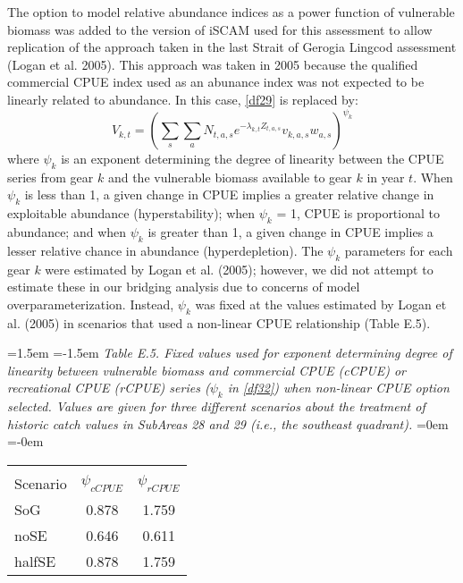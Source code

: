\documentclass[11pt]{article}   %
\def\AppLet{E}                   %
\def\vsd{\vspace*{1ex}}     %
\begin{document}
The option to model relative abundance indices as a power function of vulnerable biomass was added to the version of iSCAM used for this assessment to allow replication of the approach taken in the last Strait of Gerogia Lingcod assessment (Logan et al. 2005).  This approach was taken in 2005 because the qualified commercial CPUE index used as an abunance index was not expected to be linearly related to abundance.  In this case, \eqref{df29} is replaced by:      
\begin{equation}\label{df32}
 V_{k,t} = (\sum_s \sum_a N_{t,a,s} e^{-\lambda_{k,t} Z_{t,a,s}} v_{k,a,s} w_{a,s})^{\psi_k}
\end{equation}
where $\psi_k$ is an exponent determining the degree of linearity between the CPUE series from gear $k$ and the vulnerable biomass available to gear $k$ in year $t$.  When $\psi_k$ is less than 1, a given change in CPUE implies a greater relative change in exploitable abundance (hyperstability); when $\psi_k$ = 1, CPUE is proportional to abundance; and when $\psi_k$ is greater than 1, a given change in CPUE implies a lesser relative chance in abundance (hyperdepletion).  The $\psi_k$ parameters for each gear $k$ were estimated by Logan et al. (2005); however, we did not attempt to estimate these in our bridging analysis due to concerns of model overparameterization.  Instead, $\psi_k$ was fixed at the values estimated by Logan et al. (2005) in scenarios that used a non-linear CPUE relationship (Table \AppLet.5).        


\begin{table}[tp]
\leftskip=1.5em
\parindent=-1.5em
{\it Table \AppLet.5. Fixed values used for exponent determining degree of linearity between vulnerable biomass and commercial CPUE (cCPUE) or recreational CPUE (rCPUE) series ($\psi_k$  in \eqref{df32}) when non-linear CPUE option selected.  Values are given for three different scenarios about the treatment of historic catch values in SubAreas 28 and 29 (i.e., the southeast quadrant).  }
\leftskip=0em
\parindent=-0em
\begin{center}
\begin{tabular}{lcc} 
\hline \\[-1.5ex]
Scenario   &   $\psi_{cCPUE}$       &    $\psi_{rCPUE}$   \\ 
\hline %
SoG & 0.878 & 1.759 \\
noSE & 0.646 & 0.611 \\
halfSE & 0.878 & 1.759 \\
\hline 
\end{tabular} 
\vsd
\end{center}
\end{table}
\end{document}

